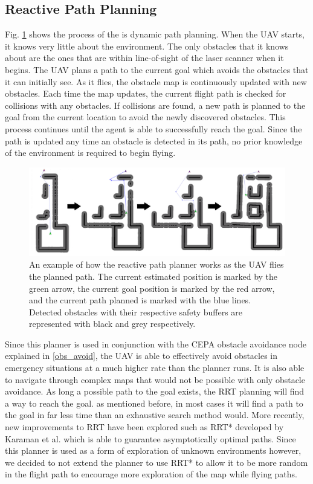 \documentclass[letterpaper, 10 pt, conference]{ieeeconf}  %
\begin{document}
\subsection{Reactive Path Planning}

Fig. \ref{fig:reactive_plan} shows the process of the is dynamic path planning. When the UAV starts, it knows very little about the environment. The only obstacles that it knows about are the ones that are within line-of-sight of the laser scanner when it begins. The UAV plans a path to the current goal which avoids the obstacles that it can initially see. As it flies, the obstacle map is continuously updated with new obstacles. Each time the map updates, the current flight path is checked for collisions with any obstacles. If collisions are found, a new path is planned to the goal from the current location to avoid the newly discovered obstacles. This process continues until the agent is able to successfully reach the goal. Since the path is updated any time an obstacle is detected in its path, no prior knowledge of the environment is required to begin flying.

\begin{figure}
\centering
\includegraphics[width=1.0\linewidth]{adaptive_path_plan2.png}
\caption{An example of how the reactive path planner works as the UAV flies the planned path. The current estimated position is marked by the green arrow, the current goal position is marked by the red arrow, and the current path planned is marked with the blue lines. Detected obstacles with their respective safety buffers are represented with black and grey respectively.}
\label{fig:reactive_plan}
\end{figure}

Since this planner is used in conjunction with the CEPA obstacle avoidance node explained in \ref{obs_avoid}, the UAV is able to effectively avoid obstacles in emergency situations at a much higher rate than the planner runs. It is also able to navigate through complex maps that would not be possible with only obstacle avoidance. As long a possible path to the goal exists, the RRT planning will find a way to reach the goal. as mentioned before, in most cases it will find a path to the goal in far less time than an exhaustive search method would. More recently, new improvements to RRT have been explored such as RRT* developed by Karaman et al. \cite{Karaman2011} which is able to guarantee asymptotically optimal paths. Since this planner is used as a form of exploration of unknown environments however, we decided to not extend the planner to use RRT* to allow it to be more random in the flight path to encourage more exploration of the map while flying paths.
\end{document}
